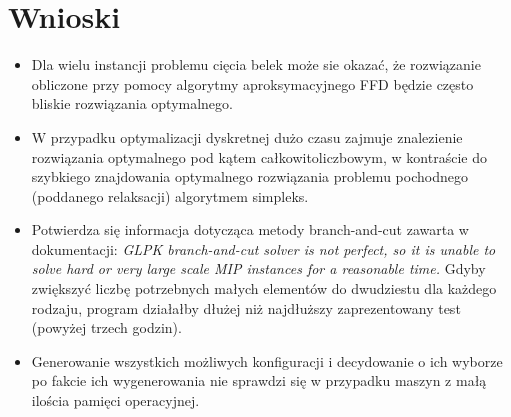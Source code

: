 \section{Wnioski}

\begin{itemize}
	\item Dla wielu instancji problemu cięcia belek może sie okazać, że rozwiązanie obliczone przy pomocy algorytmy aproksymacyjnego FFD będzie często bliskie rozwiązania optymalnego.
	\item W przypadku optymalizacji dyskretnej dużo czasu zajmuje znalezienie rozwiązania optymalnego pod kątem całkowitoliczbowym, w kontraście do szybkiego znajdowania optymalnego rozwiązania problemu pochodnego (poddanego relaksacji) algorytmem simpleks.
	\item Potwierdza się informacja dotycząca metody branch-and-cut zawarta w dokumentacji: \textit{GLPK branch-and-cut solver is not perfect, so it is unable to solve hard or very large scale MIP instances for a reasonable time.} Gdyby zwiększyć liczbę potrzebnych małych elementów do dwudziestu dla każdego rodzaju, program działałby dłużej niż najdłuższy zaprezentowany test (powyżej trzech godzin).
	\item Generowanie wszystkich możliwych konfiguracji i decydowanie o ich wyborze po fakcie ich wygenerowania nie sprawdzi się w przypadku maszyn z małą ilościa pamięci operacyjnej.
\end{itemize}






